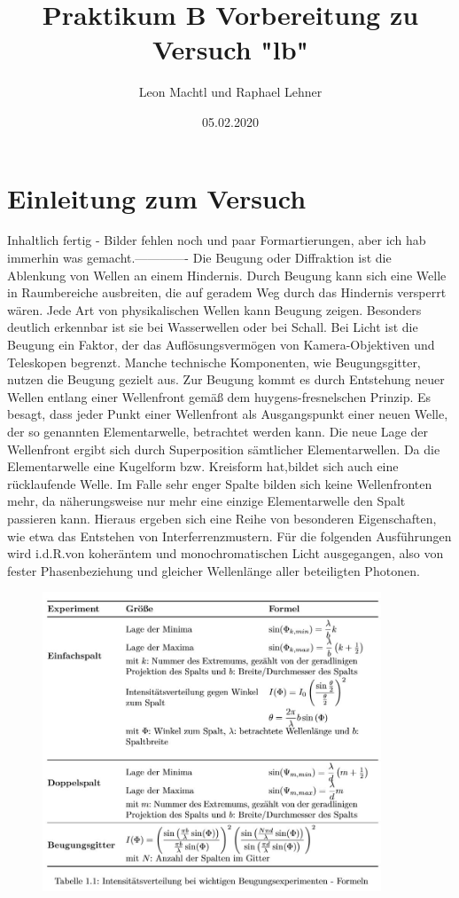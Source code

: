 \documentclass[a4paper,10pt]{scrartcl}
\title{Praktikum B Vorbereitung zu Versuch "lb"}
\author{Leon Machtl und Raphael Lehner}
\date{05.02.2020}
\begin{document}
	\maketitle
	\tableofcontents
	\newpage
	
	\section{Einleitung zum Versuch}
	Inhaltlich fertig - Bilder fehlen noch und paar Formartierungen, aber ich hab immerhin was gemacht.-------------
	Die Beugung oder Diﬀraktion ist die Ablenkung von Wellen an einem Hindernis. Durch Beugung kann sich eine Welle in Raumbereiche ausbreiten, die auf geradem Weg durch das Hindernis versperrt wären. Jede Art von physikalischen Wellen kann Beugung zeigen. Besonders deutlich erkennbar ist sie bei Wasserwellen oder bei Schall. Bei Licht ist die Beugung ein Faktor, der das Auﬂösungsvermögen von Kamera-Objektiven und Teleskopen begrenzt. Manche technische Komponenten, wie Beugungsgitter, nutzen die Beugung gezielt aus. Zur Beugung kommt es durch Entstehung neuer Wellen entlang einer Wellenfront gemäß dem huygens-fresnelschen Prinzip. Es besagt, dass jeder Punkt einer Wellenfront als Ausgangspunkt einer neuen Welle, der so genannten Elementarwelle, betrachtet werden kann. Die neue Lage der Wellenfront ergibt sich durch Superposition sämtlicher Elementarwellen. Da die Elementarwelle eine Kugelform bzw. Kreisform hat,bildet sich auch eine rücklaufende Welle. Im Falle sehr enger Spalte bilden sich keine Wellenfronten mehr, da näherungsweise nur mehr eine einzige Elementarwelle den Spalt passieren kann. Hieraus ergeben sich eine Reihe von besonderen Eigenschaften, wie etwa das Entstehen von Interferrenzmustern. Für die folgenden Ausführungen wird i.d.R.von koheräntem und monochromatischen Licht ausgegangen, also von fester Phasenbeziehung und gleicher Wellenlänge aller beteiligten Photonen.
		
		\FloatBarrier
			\begin{figure}[h]
\centering
\includegraphics[width=0.9\textwidth]{./Bilder/lb01}

\end{figure}
\FloatBarrier
\end{document}
